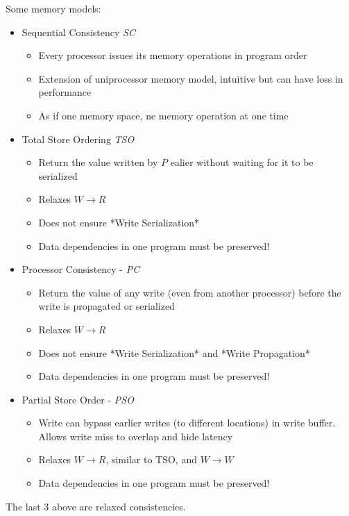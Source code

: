 \documentclass{article}
\begin{document}
Some memory models:
\begin{itemize}
    \item Sequential Consistency \textit{SC}
          \begin{itemize}
              \item Every processor issues its memory operations in program order
              \item Extension of uniprocessor memory model, intuitive but can have loss in performance
              \item As if one memory space, ne memory operation at one time
          \end{itemize}
    \item Total Store Ordering \textit{TSO}
          \begin{itemize}
              \item Return the value written by $P$ ealier without waiting for it to be serialized
              \item Relaxes $W \rightarrow R$
              \item Does not ensure *Write Serialization*
              \item Data dependencies in one program must be preserved!
          \end{itemize}
    \item Processor Consistency - \textit{PC}
          \begin{itemize}
              \item Return the value of any write (even from another processor) before the write is propagated or serialized
              \item Relaxes $W \rightarrow R$
              \item Does not ensure *Write Serialization* and *Write Propagation*
              \item Data dependencies in one program must be preserved!
          \end{itemize}
    \item Partial Store Order - \textit{PSO}
          \begin{itemize}
              \item Write can bypass earlier writes (to different locations) in write buffer. Allows write miss to overlap and hide latency
              \item Relaxes $W \rightarrow R$, similar to TSO, and $W \rightarrow W$
              \item Data dependencies in one program must be preserved!
          \end{itemize}
\end{itemize}
The last 3 above are relaxed consistencies.
\end{document}
